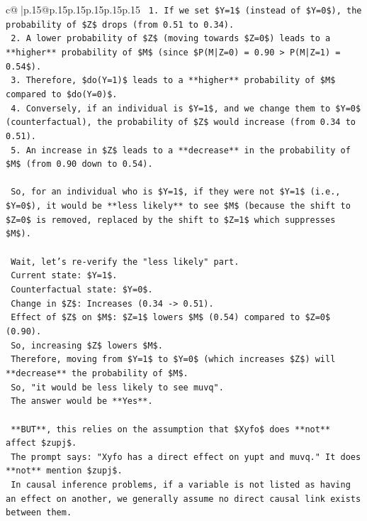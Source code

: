 \documentclass{article}
\begin{document}
{\begin{supertabular}{c@{$\;$}|p{.15\linewidth}@{}p{.15\linewidth}p{.15\linewidth}p{.15\linewidth}p{.15\linewidth}p{.15\linewidth}}
{{{\texttt{    1.  If we set \$Y=1\$ (instead of \$Y=0\$), the probability of \$Z\$ drops (from 0.51 to 0.34).} \\
\texttt{    2.  A lower probability of \$Z\$ (moving towards \$Z=0\$) leads to a **higher** probability of \$M\$ (since \$P(M|Z=0) = 0.90 > P(M|Z=1) = 0.54\$).} \\
\texttt{    3.  Therefore, \$do(Y=1)\$ leads to a **higher** probability of \$M\$ compared to \$do(Y=0)\$.} \\
\texttt{    4.  Conversely, if an individual is \$Y=1\$, and we change them to \$Y=0\$ (counterfactual), the probability of \$Z\$ would increase (from 0.34 to 0.51).} \\
\texttt{    5.  An increase in \$Z\$ leads to a **decrease** in the probability of \$M\$ (from 0.90 down to 0.54).} \\
\\ 
\texttt{    So, for an individual who is \$Y=1\$, if they were not \$Y=1\$ (i.e., \$Y=0\$), it would be **less likely** to see \$M\$ (because the shift to \$Z=0\$ is removed, replaced by the shift to \$Z=1\$ which suppresses \$M\$).} \\
\\ 
\texttt{    Wait, let's re{-}verify the "less likely" part.} \\
\texttt{    Current state: \$Y=1\$.} \\
\texttt{    Counterfactual state: \$Y=0\$.} \\
\texttt{    Change in \$Z\$: Increases (0.34 {-}> 0.51).} \\
\texttt{    Effect of \$Z\$ on \$M\$: \$Z=1\$ lowers \$M\$ (0.54) compared to \$Z=0\$ (0.90).} \\
\texttt{    So, increasing \$Z\$ lowers \$M\$.} \\
\texttt{    Therefore, moving from \$Y=1\$ to \$Y=0\$ (which increases \$Z\$) will **decrease** the probability of \$M\$.} \\
\texttt{    So, "it would be less likely to see muvq".} \\
\texttt{    The answer would be **Yes**.} \\
\\ 
\texttt{    **BUT**, this relies on the assumption that \$Xyfo\$ does **not** affect \$zupj\$.} \\
\texttt{    The prompt says: "Xyfo has a direct effect on yupt and muvq." It does **not** mention \$zupj\$.} \\
\texttt{    In causal inference problems, if a variable is not listed as having an effect on another, we generally assume no direct causal link exists between them.} \\
}}}
\end{supertabular}}
\end{document}
